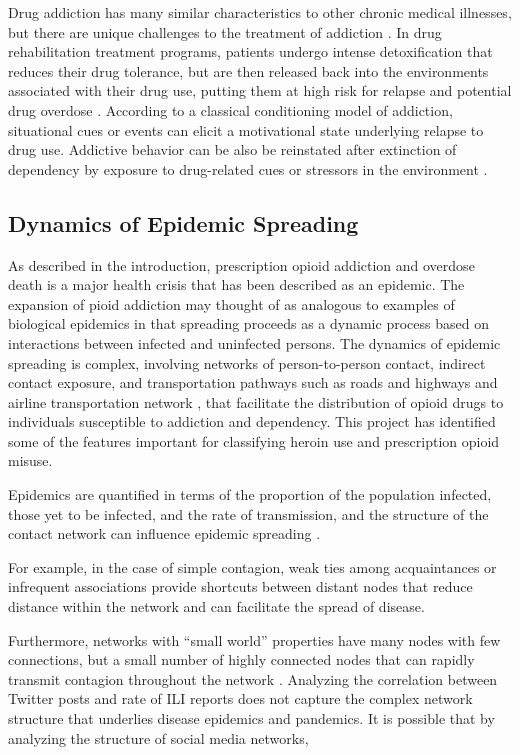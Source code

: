 \documentclass[sigconf]{acmart}
\begin{document}
Drug addiction has many similar characteristics to other chronic medical 
illnesses, but there are unique challenges to the treatment of addiction
\cite{marsch12, swendson16}. In drug rehabilitation treatment programs, 
patients undergo intense detoxification that reduces their drug tolerance, but 
are then released back into the environments associated with their drug use, 
putting them at high risk for relapse and potential drug overdose 
\cite{johnson11}. According to a classical conditioning model of addiction, 
situational cues or events can elicit a motivational state underlying relapse 
to drug use. Addictive behavior can be also be reinstated after extinction of 
dependency by exposure to drug-related cues or stressors in the environment 
\cite{shaham03}. 


\subsection{Dynamics of Epidemic Spreading}

As described in the introduction, prescription opioid addiction and overdose 
death is a major health crisis that has been described as an epidemic.
The expansion of pioid addiction may thought of as analogous to examples of
biological epidemics in that spreading proceeds as a dynamic process based on 
interactions between infected and uninfected persons. The dynamics of 
epidemic spreading is complex, involving networks of person-to-person contact, 
indirect contact exposure, and transportation pathways such as roads and 
highways and airline transportation network \cite{Colizza06}, that facilitate 
the distribution of opioid drugs to individuals susceptible to addiction and 
dependency. This project has identified some of the features important for 
classifying heroin use and prescription opioid misuse. 

Epidemics are quantified in terms of the proportion of the population infected, 
those yet to be infected, and the rate of transmission, and the structure of the 
contact network can influence epidemic spreading \cite{pastor01}. 

For example, in the case of simple contagion, weak ties among 
acquaintances or infrequent associations provide shortcuts between distant nodes 
that reduce distance within the network \cite{granovetter73} and can facilitate 
the spread of disease. 

Furthermore, networks with ``small world'' properties have many nodes with 
few connections, but a small number of highly connected nodes that can rapidly 
transmit contagion throughout the network \cite{watts98}. Analyzing the 
correlation between Twitter posts and rate of ILI reports does not capture the 
complex network structure that underlies disease epidemics and pandemics. 
It is possible that by analyzing the structure of social media networks, 
\end{document}
